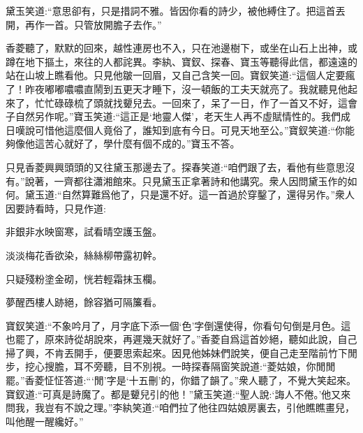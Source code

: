 \begin{parag}
    黛玉笑道:“意思卻有，只是措詞不雅。皆因你看的詩少，被他縛住了。把這首丟開，再作一首。只管放開膽子去作。”
\end{parag}


\begin{parag}
    香菱聽了，默默的回來，越性連房也不入，只在池邊樹下，或坐在山石上出神，或蹲在地下摳土，來往的人都詫異。李紈、寶釵、探春、寶玉等聽得此信，都遠遠的站在山坡上瞧看他。只見他皺一回眉，又自己含笑一回。寶釵笑道:“這個人定要瘋了！昨夜嘟嘟噥噥直鬧到五更天才睡下，沒一頓飯的工夫天就亮了。我就聽見他起來了，忙忙碌碌梳了頭就找顰兒去。一回來了，呆了一日，作了一首又不好，這會子自然另作呢。”寶玉笑道:“這正是‘地靈人傑’，老天生人再不虛賦情性的。我們成日嘆說可惜他這麼個人竟俗了，誰知到底有今日。可見天地至公。”寶釵笑道:“你能夠像他這苦心就好了，學什麼有個不成的。”寶玉不答。
\end{parag}


\begin{parag}
    只見香菱興興頭頭的又往黛玉那邊去了。探春笑道:“咱們跟了去，看他有些意思沒有。”說著，一齊都往瀟湘館來。只見黛玉正拿著詩和他講究。衆人因問黛玉作的如何。黛玉道:“自然算難爲他了，只是還不好。這一首過於穿鑿了，還得另作。”衆人因要詩看時，只見作道:
\end{parag}


\begin{poem}
    \begin{pl}非銀非水映窗寒，試看晴空護玉盤。\end{pl}

    \begin{pl}淡淡梅花香欲染，絲絲柳帶露初幹。\end{pl}

    \begin{pl}只疑殘粉塗金砌，恍若輕霜抹玉欄。\end{pl}

    \begin{pl}夢醒西樓人跡絕，餘容猶可隔簾看。\end{pl}
\end{poem}


\begin{parag}
    寶釵笑道:“不象吟月了，月字底下添一個‘色’字倒還使得，你看句句倒是月色。這也罷了，原來詩從胡說來，再遲幾天就好了。”香菱自爲這首妙絕，聽如此說，自己掃了興，不肯丟開手，便要思索起來。因見他姊妹們說笑，便自己走至階前竹下閒步，挖心搜膽，耳不旁聽，目不別視。一時探春隔窗笑說道:“菱姑娘，你閒閒罷。”香菱怔怔答道:“‘閒’字是‘十五刪’的，你錯了韻了。”衆人聽了，不覺大笑起來。寶釵道:“可真是詩魔了。都是顰兒引的他！”黛玉笑道:“聖人說:‘誨人不倦。’他又來問我，我豈有不說之理。”李紈笑道:“咱們拉了他往四姑娘房裏去，引他瞧瞧畫兒，叫他醒一醒纔好。”
\end{parag}


